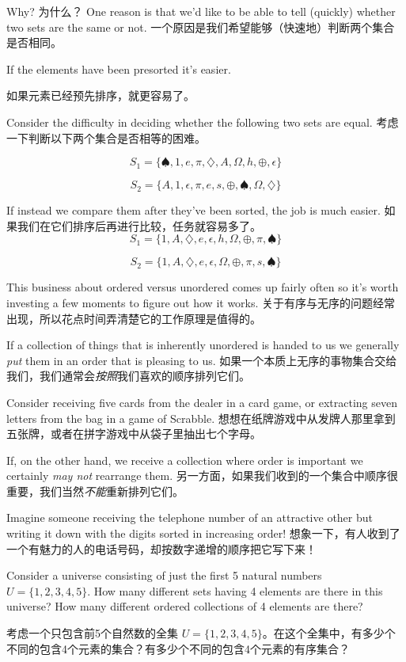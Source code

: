 Why?
为什么？
One reason is that we'd like to be able to tell (quickly) whether two sets
are the same or not.
一个原因是我们希望能够（快速地）判断两个集合是否相同。

If the elements have been presorted it's easier.

如果元素已经预先排序，就更容易了。

Consider the difficulty in deciding whether the following two sets are
equal.
考虑一下判断以下两个集合是否相等的困难。
\vfill

\[ S_1 = \{ \spadesuit, 1, e, \pi, \diamondsuit, A, \Omega, h, \oplus, \epsilon \} \]

\vfill

\[ S_2 = \{ A, 1, \epsilon, \pi, e, s, \oplus,  \spadesuit, \Omega, \diamondsuit \} \]

\newpage
If instead we compare them after they've been sorted, the job is much easier.
如果我们在它们排序后再进行比较，任务就容易多了。
\[ S_1 = \{1, A, \diamondsuit, e, \epsilon, h, \Omega, \oplus, \pi, \spadesuit \} \]

\[ S_2 = \{1, A, \diamondsuit, e, \epsilon, \Omega, \oplus, \pi, s, \spadesuit \} \]

This business about ordered versus unordered comes up fairly often so it's 
worth investing a few moments to figure out how it works.
关于有序与无序的问题经常出现，所以花点时间弄清楚它的工作原理是值得的。

If a collection
of things that is inherently unordered is handed to us we generally \emph{put}
them in an order that is pleasing to us.
如果一个本质上无序的事物集合交给我们，我们通常会\emph{按照}我们喜欢的顺序排列它们。

Consider receiving five cards
from the dealer in a card game, or extracting seven letters from the bag 
in a game of Scrabble.
想想在纸牌游戏中从发牌人那里拿到五张牌，或者在拼字游戏中从袋子里抽出七个字母。

If, on the other hand, we receive 
a collection where order
is important we certainly \emph{may not} rearrange them.
另一方面，如果我们收到的一个集合中顺序很重要，我们当然\emph{不能}重新排列它们。

Imagine someone
receiving the telephone number of an attractive other but writing it down
with the digits sorted in increasing order!
想象一下，有人收到了一个有魅力的人的电话号码，却按数字递增的顺序把它写下来！
\begin{exer}
Consider a universe consisting of just the first 5 natural numbers
$U = \{ 1, 2, 3, 4, 5 \}$.
How many different sets having 4 elements
are there in this universe?
How many different ordered collections of 4 
elements are there? 

考虑一个只包含前5个自然数的全集 $U = \{ 1, 2, 3, 4, 5 \}$。在这个全集中，有多少个不同的包含4个元素的集合？有多少个不同的包含4个元素的有序集合？
\end{exer}

